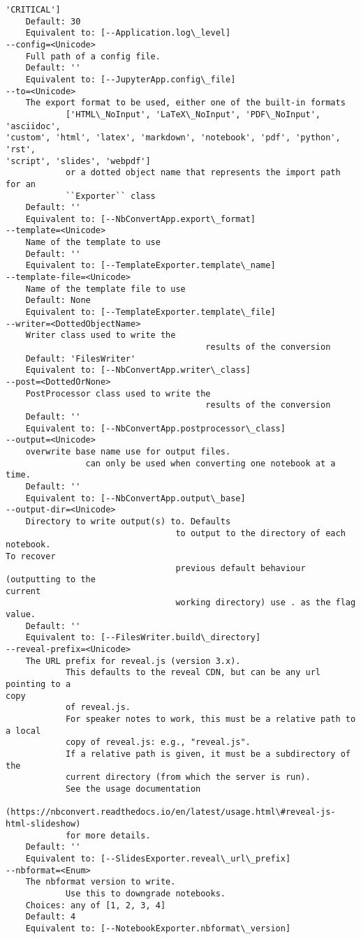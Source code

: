 \documentclass[11pt]{article}
\begin{document}
\begin{Verbatim}[commandchars=\\\{\}]
'CRITICAL']
    Default: 30
    Equivalent to: [--Application.log\_level]
--config=<Unicode>
    Full path of a config file.
    Default: ''
    Equivalent to: [--JupyterApp.config\_file]
--to=<Unicode>
    The export format to be used, either one of the built-in formats
            ['HTML\_NoInput', 'LaTeX\_NoInput', 'PDF\_NoInput', 'asciidoc',
'custom', 'html', 'latex', 'markdown', 'notebook', 'pdf', 'python', 'rst',
'script', 'slides', 'webpdf']
            or a dotted object name that represents the import path for an
            ``Exporter`` class
    Default: ''
    Equivalent to: [--NbConvertApp.export\_format]
--template=<Unicode>
    Name of the template to use
    Default: ''
    Equivalent to: [--TemplateExporter.template\_name]
--template-file=<Unicode>
    Name of the template file to use
    Default: None
    Equivalent to: [--TemplateExporter.template\_file]
--writer=<DottedObjectName>
    Writer class used to write the
                                        results of the conversion
    Default: 'FilesWriter'
    Equivalent to: [--NbConvertApp.writer\_class]
--post=<DottedOrNone>
    PostProcessor class used to write the
                                        results of the conversion
    Default: ''
    Equivalent to: [--NbConvertApp.postprocessor\_class]
--output=<Unicode>
    overwrite base name use for output files.
                can only be used when converting one notebook at a time.
    Default: ''
    Equivalent to: [--NbConvertApp.output\_base]
--output-dir=<Unicode>
    Directory to write output(s) to. Defaults
                                  to output to the directory of each notebook.
To recover
                                  previous default behaviour (outputting to the
current
                                  working directory) use . as the flag value.
    Default: ''
    Equivalent to: [--FilesWriter.build\_directory]
--reveal-prefix=<Unicode>
    The URL prefix for reveal.js (version 3.x).
            This defaults to the reveal CDN, but can be any url pointing to a
copy
            of reveal.js.
            For speaker notes to work, this must be a relative path to a local
            copy of reveal.js: e.g., "reveal.js".
            If a relative path is given, it must be a subdirectory of the
            current directory (from which the server is run).
            See the usage documentation
            (https://nbconvert.readthedocs.io/en/latest/usage.html\#reveal-js-
html-slideshow)
            for more details.
    Default: ''
    Equivalent to: [--SlidesExporter.reveal\_url\_prefix]
--nbformat=<Enum>
    The nbformat version to write.
            Use this to downgrade notebooks.
    Choices: any of [1, 2, 3, 4]
    Default: 4
    Equivalent to: [--NotebookExporter.nbformat\_version]


\end{Verbatim}
\end{document}
